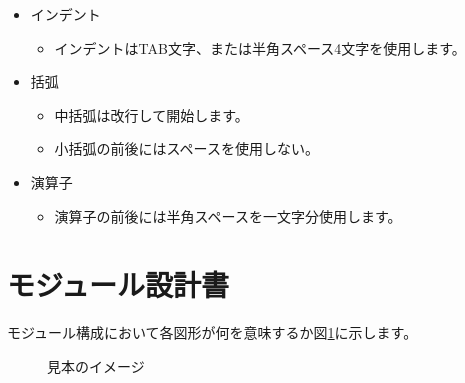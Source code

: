 \documentclass[a4j]{jarticle}
\begin{document}
\begin{itemize}
  \item インデント
  \begin{itemize}
    \item インデントはTAB文字、または半角スペース4文字を使用します。
  \end{itemize}

  \item 括弧
  \begin{itemize}
    \item 中括弧は改行して開始します。
    \item 小括弧の前後にはスペースを使用しない。
  \end{itemize}

  \item 演算子
  \begin{itemize}
    \item 演算子の前後には半角スペースを一文字分使用します。
  \end{itemize}

\end{itemize}

\section{モジュール設計書}
モジュール構成において各図形が何を意味するか図\ref{sample}に示します。


\begin{figure}[H]
    \begin{center}
    \caption {見本のイメージ}
    \label{sample}
    \end{center}
\end{figure}
\end{document}
